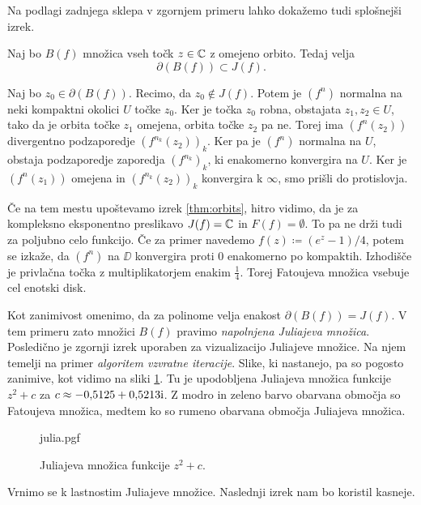\noindent Na podlagi zadnjega sklepa v zgornjem primeru lahko dokažemo tudi splošnejši izrek.

\begin{izrek} \label{thm:rob}
    Naj bo \(B (f)\) množica vseh točk \(z \in \mathbb C\) z omejeno orbito. Tedaj velja
    \[\partial (B (f)) \subset J (f).\]
\end{izrek}

\begin{dokaz}
    Naj bo \(z_0 \in \partial (B (f))\). Recimo, da \(z_0 \notin J (f)\). Potem je \((f^n)\) normalna na neki kompaktni okolici \(U\) točke \(z_0\). Ker je točka \(z_0\) robna, obstajata \(z_1, z_2 \in U\), tako da je orbita točke \(z_1\) omejena, orbita točke \(z_2\) pa ne. Torej ima \((f^n (z_2))\) divergentno podzaporedje \((f^{n_k} (z_2))_k\). Ker pa je \((f^n)\) normalna na \(U\), obstaja podzaporedje zaporedja \((f^{n_k})_k\), ki enakomerno konvergira na \(U\). Ker je \((f^n (z_1))\) omejena in \((f^{n_k} (z_2))_k\) konvergira k \(\infty\), smo prišli do protislovja.
\end{dokaz}

\noindent Če na tem mestu upoštevamo izrek \ref{thm:orbits}, hitro vidimo, da je za kompleksno eksponentno preslikavo \(J (f) = \mathbb C\) in \(F (f) = \emptyset\). To pa ne drži tudi za poljubno celo funkcijo. Če za primer navedemo \(f (z) \coloneq (e^z - 1) / 4\), potem se izkaže, da \((f^n)\) na \(\DD\) konvergira proti \num{0} enakomerno po kompaktih. Izhodišče je privlačna točka z multiplikatorjem enakim \(\frac{1}{4}\). Torej Fatoujeva množica vsebuje cel enotski disk.

Kot zanimivost omenimo, da za polinome velja enakost \(\partial (B (f)) = J (f)\). V tem primeru zato množici \(B (f)\) pravimo \emph{napolnjena Juliajeva množica}. Posledično je zgornji izrek uporaben za vizualizacijo Juliajeve množice. Na njem temelji na primer \emph{algoritem vzvratne iteracije}. Slike, ki nastanejo, pa so pogosto zanimive, kot vidimo na sliki \ref{fig:julia}. Tu je upodobljena Juliajeva množica funkcije \(z^2 + c\) za \(c \approx \complexnum{-0.5125+0.5213i}\). Z modro in zeleno barvo obarvana območja so Fatoujeva množica, medtem ko so rumeno obarvana območja Juliajeva množica.
\begin{figure}
    \centering
    {julia.pgf}
    \caption[Juliajeva množica]{Juliajeva množica funkcije \(z^2 + c\).}
    \label{fig:julia}
\end{figure}

Vrnimo se k lastnostim Juliajeve množice. Naslednji izrek nam bo koristil kasneje.

